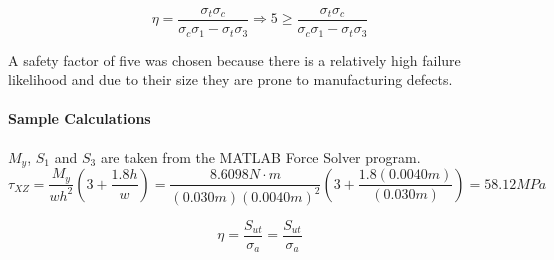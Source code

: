 \documentclass[../main.tex]{subfiles}
\begin{document}
\begin{equation}
\eta = \frac{\sigma_t\sigma_c} {\sigma_c\sigma_1 -\sigma_t\sigma_3} \Rightarrow 5 \geq \frac{\sigma_t\sigma_c} {\sigma_c\sigma_1 -\sigma_t\sigma_3}
\end{equation}

A safety factor of five was chosen because there is a relatively high failure likelihood and due to their size they are prone to manufacturing defects.

\paragraph*{Sample Calculations}
$M_y$, $S_1$ and $S_3$ are taken from the MATLAB Force Solver program.
$$\tau_{XZ} = \dfrac{M_{y}}{wh^2}(3+\frac{1.8h}{w})= \dfrac{8.6098N\cdot{}m}{(0.030m)(0.0040m)^2}(3+\frac{1.8(0.0040m)}{(0.030m)})=58.12MPa$$

$$\eta = \dfrac{S_{ut}}{\sigma _a} = \dfrac{S_{ut}}{\sigma _a}$$
\end{document}
